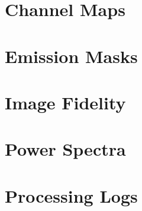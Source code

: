 \documentclass[11pt]{article}
\begin{document}
 
 
 
 

\section{Channel Maps}
\label{sect:channel_maps}
%

\section{Emission Masks}
\label{sect:emission_masks}
%

\section{Image Fidelity}
\label{sec:fidelity}
%
%

\section{Power Spectra}
\label{sec:powerspec}
%
%

\section{Processing Logs}
\label{sec:logs}

\end{document}
